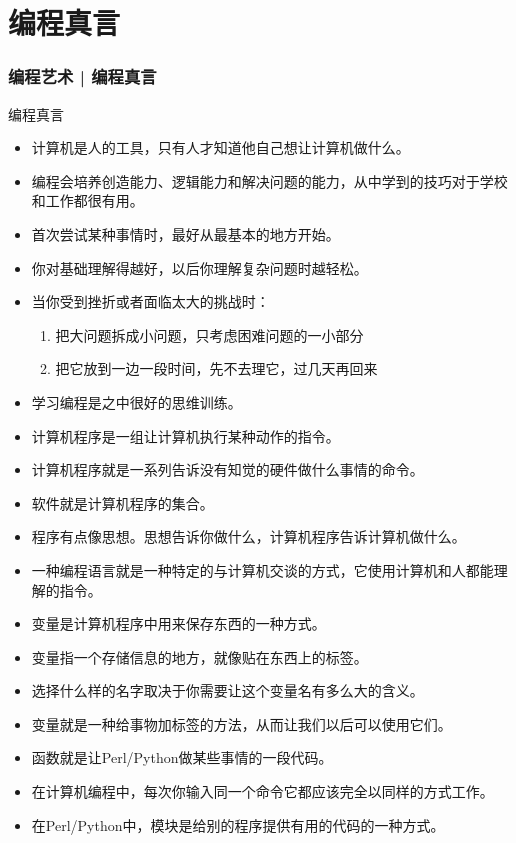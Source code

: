 \section{编程真言}
\begin{frame}
  \frametitle{编程艺术 | 编程真言}
  \begin{block}{编程真言}
    \begin{itemize}
      \item 计算机是人的工具，只有人才知道他自己想让计算机做什么。
      \item 编程会培养创造能力、逻辑能力和解决问题的能力，从中学到的技巧对于学校和工作都很有用。
      \item 首次尝试某种事情时，最好从最基本的地方开始。
      \item 你对基础理解得越好，以后你理解复杂问题时越轻松。
      \item 当你受到挫折或者面临太大的挑战时：
        \begin{enumerate}
          \item 把大问题拆成小问题，只考虑困难问题的一小部分
          \item 把它放到一边一段时间，先不去理它，过几天再回来
        \end{enumerate}
      \item 学习编程是之中很好的思维训练。
      \item 计算机程序是一组让计算机执行某种动作的指令。
      \item 计算机程序就是一系列告诉没有知觉的硬件做什么事情的命令。
      \item 软件就是计算机程序的集合。
      \item 程序有点像思想。思想告诉你做什么，计算机程序告诉计算机做什么。
      \item 一种编程语言就是一种特定的与计算机交谈的方式，它使用计算机和人都能理解的指令。
      \item 变量是计算机程序中用来保存东西的一种方式。
      \item 变量指一个存储信息的地方，就像贴在东西上的标签。
      \item 选择什么样的名字取决于你需要让这个变量名有多么大的含义。
      \item 变量就是一种给事物加标签的方法，从而让我们以后可以使用它们。
      \item 函数就是让Perl/Python做某些事情的一段代码。
      \item 在计算机编程中，每次你输入同一个命令它都应该完全以同样的方式工作。
      \item 在Perl/Python中，模块是给别的程序提供有用的代码的一种方式。

\end{itemize}
\end{block}
\end{frame}
